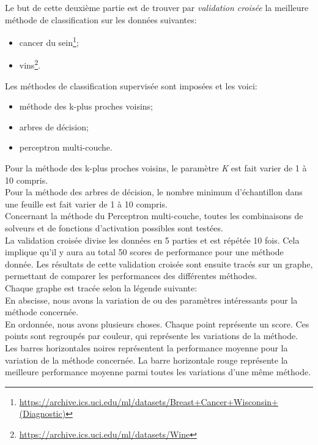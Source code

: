 \documentclass[11pt, a4paper]{article}
\begin{document}
Le but de cette deuxième partie est de trouver par \textit{validation croisée}
la meilleure méthode de classification sur les données suivantes:
\begin{itemize}
    \item cancer du sein\footnote{\url{https://archive.ics.uci.edu/ml/datasets/Breast+Cancer+Wisconsin+(Diagnostic)}};
    \item vins\footnote{\url{https://archive.ics.uci.edu/ml/datasets/Wine}}. \\
\end{itemize}

Les méthodes de classification supervisée sont imposées et les voici:
\begin{itemize}
    \item méthode des k-plus proches voisins;
    \item arbres de décision;
    \item perceptron multi-couche. \\
\end{itemize}

Pour la méthode des k-plus proches voisins, le paramètre \textit{K} est fait varier de 1 à 10 compris. \\
Pour la méthode des arbres de décision,
le nombre minimum d'échantillon dans une feuille est fait varier de 1 à 10 compris. \\
Concernant la méthode du Perceptron multi-couche,
toutes les combinaisons de solveurs et de fonctions d'activation possibles sont testées. \\

La validation croisée divise les données en 5 parties et est répétée 10 fois.
Cela implique qu'il y aura au total 50 scores de performance pour une méthode donnée.
Les résultats de cette validation croisée sont ensuite tracés sur un graphe,
permettant de comparer les performances des différentes méthodes. \\

Chaque graphe est tracée selon la légende suivante: \\
En abscisse, nous avons la variation de ou des paramètres intéressants pour la méthode concernée. \\
En ordonnée, nous avons plusieurs choses.
Chaque point représente un score.
Ces points sont regroupés par couleur, qui représente les variations de la méthode.
Les barres horizontales noires représentent la performance moyenne pour la variation de la méthode concernée.
La barre horizontale rouge représente la meilleure performance moyenne parmi toutes les variations d'une même méthode.
\end{document}
